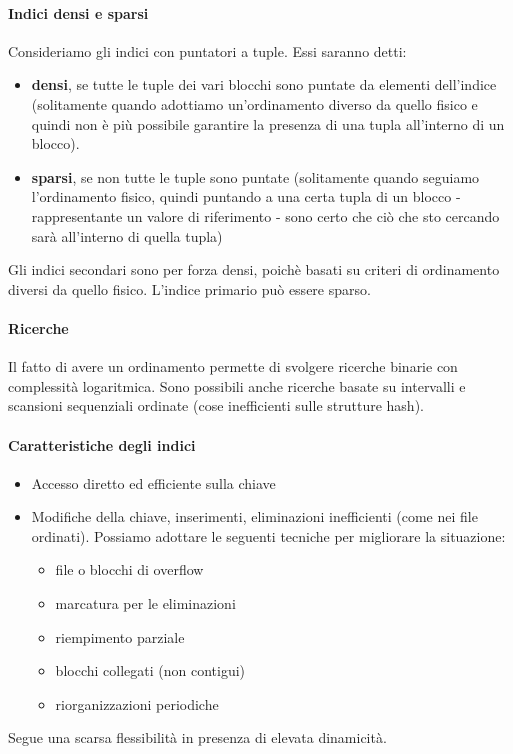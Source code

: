 \paragraph{Indici densi e sparsi} Consideriamo gli indici con puntatori a tuple. Essi saranno detti:
\begin{itemize}
	\item \textbf{densi}, se tutte le tuple dei vari blocchi sono puntate da elementi dell'indice (solitamente quando adottiamo un'ordinamento diverso da quello fisico e quindi non è più possibile garantire la presenza di una tupla all'interno di un blocco).
	\item \textbf{sparsi}, se non tutte le tuple sono puntate (solitamente quando seguiamo l'ordinamento fisico, quindi puntando a una certa tupla di un blocco - rappresentante un valore di riferimento - sono certo che ciò che sto cercando sarà all'interno di quella tupla)
\end{itemize}
Gli indici secondari sono per forza densi, poichè basati su criteri di ordinamento diversi da quello fisico. L'indice primario può essere sparso.
\paragraph{Ricerche} Il fatto di avere un ordinamento permette di svolgere ricerche binarie con complessità logaritmica. Sono possibili anche ricerche basate su intervalli e scansioni sequenziali ordinate (cose inefficienti sulle strutture hash).
\paragraph{Caratteristiche degli indici}
\begin{itemize}
	\item Accesso diretto ed efficiente sulla chiave
	\item Modifiche della chiave, inserimenti, eliminazioni inefficienti (come nei file ordinati). Possiamo adottare le seguenti tecniche per migliorare la situazione:
	\begin{itemize}
		\item file o blocchi di overflow
		\item marcatura per le eliminazioni 
		\item riempimento parziale
		\item blocchi collegati (non contigui) 
		\item riorganizzazioni periodiche
	\end{itemize}
\end{itemize}
Segue una scarsa flessibilità in presenza di elevata dinamicità.
